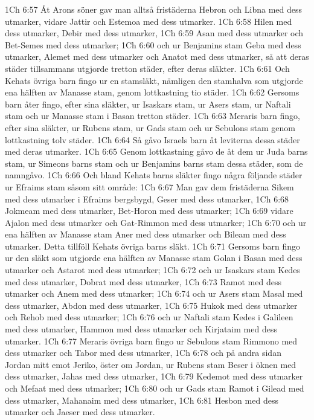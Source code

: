 1Ch 6:57  Åt Arons söner gav man alltså fristäderna Hebron och Libna med dess utmarker, vidare Jattir och Estemoa med dess utmarker.
1Ch 6:58  Hilen med dess utmarker, Debir med dess utmarker,
1Ch 6:59  Asan med dess utmarker och Bet-Semes med dess utmarker;
1Ch 6:60  och ur Benjamins stam Geba med dess utmarker, Alemet med dess utmarker och Anatot med dess utmarker, så att deras städer tillsammans utgjorde tretton städer, efter deras släkter.
1Ch 6:61  Och Kehats övriga barn fingo ur en stamsläkt, nämligen den stamhalva som utgjorde ena hälften av Manasse stam, genom lottkastning tio städer.
1Ch 6:62  Gersoms barn åter fingo, efter sina släkter, ur Isaskars stam, ur Asers stam, ur Naftali stam och ur Manasse stam i Basan tretton städer.
1Ch 6:63  Meraris barn fingo, efter sina släkter, ur Rubens stam, ur Gads stam och ur Sebulons stam genom lottkastning tolv städer.
1Ch 6:64  Så gåvo Israels barn åt leviterna dessa städer med deras utmarker.
1Ch 6:65  Genom lottkastning gåvo de åt dem ur Juda barns stam, ur Simeons barns stam och ur Benjamins barns stam dessa städer, som de namngåvo.
1Ch 6:66  Och bland Kehats barns släkter fingo några följande städer ur Efraims stam såsom sitt område:
1Ch 6:67  Man gav dem fristäderna Sikem med dess utmarker i Efraims bergsbygd, Geser med dess utmarker,
1Ch 6:68  Jokmeam med dess utmarker, Bet-Horon med dess utmarker;
1Ch 6:69  vidare Ajalon med dess utmarker och Gat-Rimmon med dess utmarker;
1Ch 6:70  och ur ena hälften av Manasse stam Aner med dess utmarker och Bileam med dess utmarker. Detta tillföll Kehats övriga barns släkt.
1Ch 6:71  Gersoms barn fingo ur den släkt som utgjorde ena hälften av Manasse stam Golan i Basan med dess utmarker och Astarot med dess utmarker;
1Ch 6:72  och ur Isaskars stam Kedes med dess utmarker, Dobrat med dess utmarker,
1Ch 6:73  Ramot med dess utmarker och Anem med dess utmarker;
1Ch 6:74  och ur Asers stam Masal med dess utmarker, Abdon med dess utmarker,
1Ch 6:75  Hukok med dess utmarker och Rehob med dess utmarker;
1Ch 6:76  och ur Naftali stam Kedes i Galileen med dess utmarker, Hammon med dess utmarker och Kirjataim med dess utmarker.
1Ch 6:77  Meraris övriga barn fingo ur Sebulons stam Rimmono med dess utmarker och Tabor med dess utmarker,
1Ch 6:78  och på andra sidan Jordan mitt emot Jeriko, öster om Jordan, ur Rubens stam Beser i öknen med dess utmarker, Jahas med dess utmarker,
1Ch 6:79  Kedemot med dess utmarker och Mefaat med dess utmarker;
1Ch 6:80  och ur Gads stam Ramot i Gilead med dess utmarker, Mahanaim med dess utmarker,
1Ch 6:81  Hesbon med dess utmarker och Jaeser med dess utmarker.

